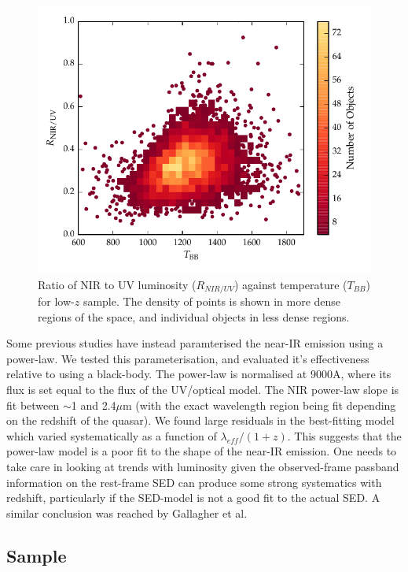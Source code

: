 \begin{figure}
  \centering
  \includegraphics[width=\textwidth]{figures/chapter05/ratio_tbb_density.pdf}
  \caption{Ratio of NIR to UV luminosity ($R_{NIR/UV}$) against temperature ($T_{BB}$) for low-$z$ sample. The density of points is shown in more dense regions of the space, and individual objects in less dense regions. }
  \label{fig:ratio_tbb_density}
\end{figure}

Some previous studies \citep[e.g.][]{wang13,zhang14} have instead paramterised the near-IR emission using a power-law. 
We tested this parameterisation, and evaluated it's effectiveness relative to using a black-body. 
The power-law is normalised at 9000A, where its flux is set equal to the flux of the UV/optical model. 
The NIR power-law slope is fit between $\sim$1 and 2.4$\mu$m (with the exact wavelength region being fit depending on the redshift of the quasar). 
We found large residuals in the best-fitting model which varied systematically as a function of $\lambda_{eff}/(1+z)$.  
This suggests that the power-law model is a poor fit to the shape of the near-IR emission. 
One needs to take care in looking at trends with luminosity given the observed-frame passband information on the rest-frame SED can produce some strong systematics with redshift, particularly if the SED-model is not a good fit to the actual SED. 
A similar conclusion was reached by Gallagher et al.

\subsection{Sample}

